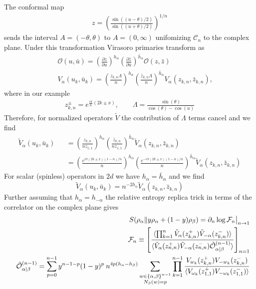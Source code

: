 \documentclass[11pt]{article}
\newcommand{\mO}{\mathcal{O}}
\newcommand{\nn}{\nonumber}
\newcommand{\lb}{\left(}
\newcommand{\rb}{\right)}
\begin{document}
  The conformal map
  \begin{eqnarray}
    z=\lb\frac{\sin((u-\theta)/2)}{\sin((u+\theta)/2)}\rb^{1/n}
  \end{eqnarray}
  sends the interval $A=(-\theta,\theta)$ to $A=(0,\infty)$ unifomizing
  $\mathcal{C}_{n}$ to the complex plane. Under this transformation Virasoro primaries
  transform as
  \begin{eqnarray}
    &&\mO(u,\bar{u})=\lb\frac{\partial z}{\partial u} \rb^{h_\alpha}\lb\frac{\partial
    \bar{z}}{\partial\bar{u}}
    \rb^{\bar{h}_\alpha}\mO(z,\bar{z})\nn\\
    &&V_\alpha(u_k,\bar{u}_k)=\lb\frac{z_{k,n}\Lambda}{n}\rb^{h_\alpha}\lb\frac{\bar{z}_{k,n}\Lambda}{n}\rb^{\bar{h}_\alpha}V_\alpha(z_{k,n},\bar{z}_{k,n}),
  \end{eqnarray}
  where in our example
  \begin{eqnarray}
    z^\pm_{k,n}=e^{\frac{i\pi}{n}(2k\pm x)},\qquad \Lambda=\frac{\sin(\theta)}{\cos(\theta)-\cos(u)}
  \end{eqnarray}
  Therefore, for normalized operators $\tilde{V}$ the contribution of $\Lambda$
  terms cancel and we find
  \begin{eqnarray}
    \tilde{V}_\alpha(u_k,\bar{u}_k)&&=\lb\frac{z_{k,n}}{n z_{1,1}}\rb^{h_\alpha}\lb\frac{\bar{z}_{k,n}}{n
    z_{1,1}}\rb^{\bar{h}_\alpha}\tilde{V}_\alpha(z_{k,n},\bar{z}_{k,n})\nn\\
    &&=\lb\frac{e^{i\pi(2k\pm x)(1-n)/n}}{n }\rb^{h_\alpha}\lb\frac{e^{-i\pi(2k\pm
    x)(1-n)/n}}{n}\rb^{\bar{h}_\alpha}\tilde{V}_\alpha(z_{k,n},\bar{z}_{k,n})
  \end{eqnarray}
  For scalar (spinless) operators in $2d$ we have $h_{\alpha}=\bar{h}_{\alpha}$
  and we find
  \begin{equation}
    \tilde{V}_{\alpha}(u_{k},\bar{u}_{k})=n^{-2h_\alpha}  \tilde{V}_{\alpha}(z_{k,n}
    ,\bar{z}_{k,n})
  \end{equation}
  Further assuming that $h_{\alpha}=h_{-\alpha}$ the relative entropy replica
  trick in terms of the correlator on the complex plane gives
  \begin{eqnarray}
    &&S(\rho_\alpha\|y\rho_\alpha+(1-y)\rho_\beta)=\partial_n\log\mathcal{F}_n\big|_{n\to 1}\nn\\
    &&\mathcal{F}_n\equiv \left[
    \frac{\braket{\prod_{k=1}^{n} \tilde{V}_{\alpha}(z^+_{k,n})\tilde{V}_{-\alpha}(z^-_{k,n})}}{\braket{\tilde{V}_\alpha(z^+_{n,n})\tilde{V}_{-\alpha}(z^-_{n,n})\tilde{\mO}^{(n-1)}_{\alpha|\beta}}}\right]_{n=1}\nn\\
    &&\tilde{\mO}_{\alpha|\beta}^{(n-1)}=\sum_{p=0}^{n-1}y^{n-1-p}(1-y)^p\: n^{4p(h_\alpha-h_\beta)}
    \sum_{\substack{w\in\{\alpha,\beta\}^{n-1}\\ N_\beta(w)=p}} \prod_{k=1}^{n-1}\frac{V_{w_k}(z_{k,n}^{+})V_{-w_k}(z_{k,n}^{-})}{\braket{V_{\omega_k}(z^+_{1,1})V_{-\omega_k}(z^-_{1,1})}}\nn\\
  \end{eqnarray}
\end{document}
